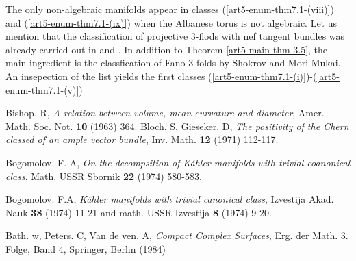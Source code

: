  The only non-algebraic manifolds appear in classes (\ref{art5-enum-thm7.1-(viii)}) and (\ref{art5-enum-thm7.1-(ix)}) when the Albanese torus is not algebraic. Let us mention that the classification of projective 3-flods with nef tangent bundles was already carried out in \cite{art5-keyCP91} and \cite{art5-keyZh90}. In addition to Theorem
 \ref{art5-main-thm-3.5}, the main ingredient is the classfication of Fano 3-folds by Shokrov and Mori-Mukai. An insepection of the list yields the first classes (\ref{art5-enum-thm7.1-(i)})-(\ref{art5-enum-thm7.1-(v)}) 

 
\begin{thebibliography}{99}
 Bishop. R, \textit{A relation between volume, mean curvature and diameter}, Amer. Math. Soc. Not. {\bf 10} (1963) 364.
 Bloch. S, Gieseker. D, \textit{The positivity of the Chern classed of an ample vector bundle}, Inv. Math. {\bf 12} (1971) 112-117.

 Bogomolov. F. A, \textit{On the decompsition of K\'ahler manifolds with trivial coanonical class}, Math. USSR Sbornik {\bf 22} (1974) 580-583.

 Bogomolov. F.A, \textit{K\"ahler manifolds with trivial canonical class}, Izvestija Akad. Nauk {\bf 38} (1974) 11-21 and math. USSR Izvestija {\bf 8} (1974) 9-20.

 Bath. w, Peters. C, Van de ven. A, \textit{Compact Complex Surfaces}, Erg. der Math. 3. Folge, Band 4, Springer, Berlin (1984)


\end{thebibliography}
